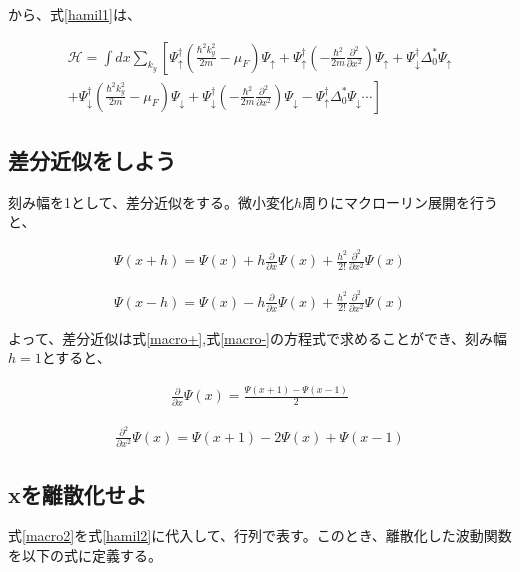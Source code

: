 \documentclass{jsarticle}
\begin{document}
		から、式\eqref{hamil1}は、

		\begin{align}
			\mathcal{H}=\int dx \sum_{k_y}
			\left[ \Psi_\uparrow^\dagger \left( \frac{\hbar^2k_y^2}{2m}-\mu_F \right)\Psi_\uparrow
			+\Psi_\uparrow^\dagger \left(- \frac{\hbar^2}{2m}\frac{\partial^2}{\partial x^2}\right)\Psi_\uparrow
			+\Psi_\downarrow^\dagger \Delta_0^\ast \Psi_\uparrow \right. \nonumber \\ \left.+
			\Psi_\downarrow^\dagger \left( \frac{\hbar^2k_y^2}{2m}-\mu_F \right)\Psi_\downarrow
			+\Psi_\downarrow^\dagger \left(- \frac{\hbar^2}{2m}\frac{\partial^2}{\partial x^2} \right) \Psi_\downarrow
			-\Psi_\uparrow^\dagger \Delta_0^\ast \Psi_\downarrow \cdots
			\right]
			\label{hamil2}
		\end{align}

		\subsection{差分近似をしよう}
		刻み幅を1として、差分近似をする。微小変化$h$周りにマクローリン展開を行うと、

		\begin{align}
			\Psi\left(x+h\right)=\Psi\left(x\right)+h\frac{\partial}{\partial x}\Psi\left(x\right)+\frac{h^2}{2!}\frac{\partial^2}{\partial x^2}\Psi\left(x\right)
			\label{macro+}
		\end{align}

		\begin{align}
			\Psi\left(x-h\right)=\Psi\left(x\right)-h\frac{\partial}{\partial x}\Psi\left(x\right)+\frac{h^2}{2!}\frac{\partial^2}{\partial x^2}\Psi\left(x\right)
			\label{macro-}
		\end{align}

		よって、差分近似は式\eqref{macro+},式\eqref{macro-}の方程式で求めることができ、刻み幅$h=1$とすると、

		\begin{align}
			\frac{\partial}{\partial x}\Psi\left(x\right)=
			\frac{\Psi\left(x+1\right)-\Psi\left(x-1\right)}{2}
		\end{align}

		\begin{align}
			\frac{\partial^2}{\partial x^2}\Psi\left(x\right)=
			\Psi\left(x+1\right)-2\Psi\left(x\right)+\Psi\left(x-1\right)
			\label{macro2}
		\end{align}

		\subsection{xを離散化せよ}
		式\eqref{macro2}を式\eqref{hamil2}に代入して、行列で表す。このとき、離散化した波動関数を以下の式に定義する。
\end{document}
